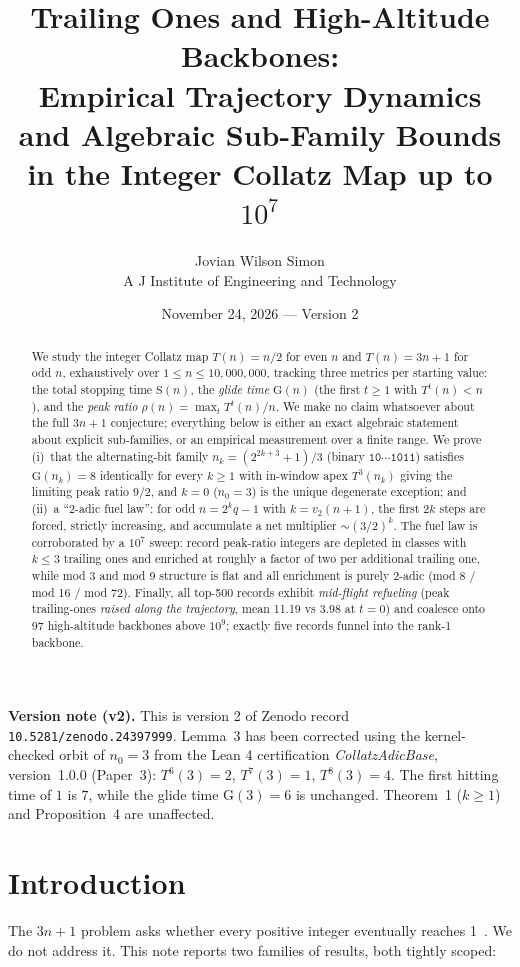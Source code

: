 \documentclass[11pt]{article}
\title{Trailing Ones and High-Altitude Backbones:\\
 Empirical Trajectory Dynamics and Algebraic Sub-Family Bounds\\
 in the Integer Collatz Map up to $10^{7}$}
\author{Jovian Wilson Simon\\A J Institute of Engineering and Technology}
\date{November 24, 2026 --- Version 2}
\theoremstyle{remark}
\newcommand{\T}{T}
\newcommand{\vtwo}{v_2}
\begin{document}
\maketitle

\noindent\textbf{Version note (v2).}
This is version 2 of Zenodo record \texttt{10.5281/zenodo.24397999}.
Lemma~3 has been corrected using the kernel-checked orbit of $n_0 = 3$ from
the Lean 4 certification \emph{CollatzAdicBase}, version~1.0.0 (Paper~3):
$\T^6(3) = 2$, $\T^7(3) = 1$, $\T^8(3) = 4$. The first hitting time of $1$ is
$7$, while the glide time $\mathrm{G}(3) = 6$ is unchanged. Theorem~1
($k \ge 1$) and Proposition~4 are unaffected.

\begin{abstract}
We study the integer Collatz map $\T(n) = n/2$ for even $n$ and
$\T(n) = 3n+1$ for odd $n$, exhaustively over $1 \le n \le 10{,}000{,}000$,
tracking three metrics per starting value: the total stopping time
$\mathrm{S}(n)$, the \emph{glide time} $\mathrm{G}(n)$ (the first $t \ge 1$
with $\T^t(n) < n$), and the \emph{peak ratio} $\rho(n) =
\max_t \T^t(n)/n$. We make no claim whatsoever about the full $3n+1$
conjecture; everything below is either an exact algebraic statement about
explicit sub-families, or an empirical measurement over a finite range.
We prove (i)~that the alternating-bit family $n_k = (2^{2k+3}+1)/3$
(binary $\texttt{10}\cdots\texttt{1011}$) satisfies $\mathrm{G}(n_k) = 8$
identically for every $k \ge 1$ with in-window apex $\T^3(n_k)$ giving the
limiting peak ratio $9/2$, and $k = 0$ ($n_0 = 3$) is the unique degenerate
exception; and (ii)~a ``2-adic fuel law'': for odd $n = 2^k q - 1$ with
$k = \vtwo(n+1)$, the first $2k$ steps are forced, strictly increasing, and
accumulate a net multiplier $\sim (3/2)^k$. The fuel law is corroborated by
a $10^7$ sweep: record peak-ratio integers are depleted in classes with
$k \le 3$ trailing ones and enriched at roughly a factor of two per
additional trailing one, while mod 3 and mod 9 structure is flat and all
enrichment is purely 2-adic (mod 8 / mod 16 / mod 72). Finally, all
top-500 records exhibit \emph{mid-flight refueling} (peak trailing-ones
\emph{raised along the trajectory}, mean 11.19 vs $3.98$ at $t=0$) and
coalesce onto 97 high-altitude backbones above $10^9$; exactly five records
funnel into the rank-1 backbone.
\end{abstract}

\section{Introduction}
The $3n+1$ problem asks whether every positive integer eventually reaches
1~\cite{lagarias2010,teras1976}. We do not address it. This note reports
two families of results, both tightly scoped:
\end{document}
